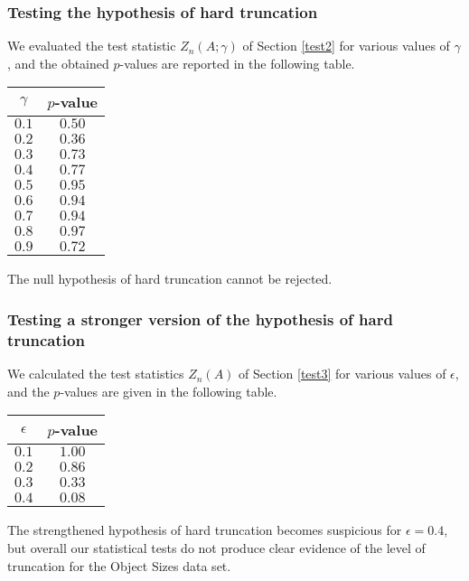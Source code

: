 \documentclass[11pt]{amsart}
\numberwithin{equation}{section}
\begin{document}
\subsubsection*{Testing the hypothesis of hard truncation} We
evaluated the test statistic $Z_n(A;\gamma)$ of Section
\ref{test2}  for various values of $\gamma$, and the obtained $p$-values
are reported in the following table.
\begin{center}
\begin{tabular}{c|c}
$\gamma$&$p$-value\\
\hline
$0.1$&$0.50$\\
$0.2$&$0.36$\\
$0.3$&$0.73$\\
$0.4$&$0.77$\\
$0.5$&$0.95$\\
$0.6$&$0.94$\\
$0.7$&$0.94$\\
$0.8$&$0.97$\\
$0.9$&$0.72$
\end{tabular}
\end{center}
The null hypothesis of hard truncation cannot be rejected.

\subsubsection*{Testing  a stronger version of the hypothesis of hard
  truncation}

We calculated the test statistics $Z_n(A)$ of Section \ref{test3} for
various values of $\epsilon$, and the
$p$-values are given in the following table.
\begin{center}
\begin{tabular}{c|c}
$\epsilon$&$p$-value\\
\hline
$0.1$&$1.00$\\
$0.2$&$0.86$\\
$0.3$&$0.33$\\
$0.4$&$0.08$
\end{tabular}
\end{center}
The strengthened hypothesis of hard   truncation becomes suspicious
for $\epsilon=0.4$, but overall our statistical tests do not produce
clear evidence of the level of truncation for the Object Sizes data
set.

\bigskip
\end{document}
